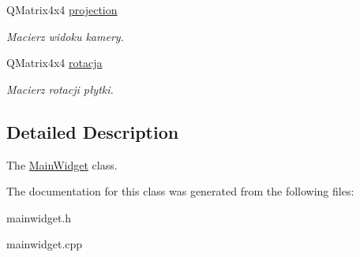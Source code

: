 \begin{DoxyCompactItemize}
\mbox{\label{classMainWidget_ab024c87ad22e1a41ec1d33dbf011fa0a}} 
Q\+Matrix4x4 \hyperlink{classMainWidget_ab024c87ad22e1a41ec1d33dbf011fa0a}{projection}
\begin{DoxyCompactList}\small\item\em Macierz widoku kamery. \end{DoxyCompactList}\item 
\mbox{\label{classMainWidget_aa834d062e80c28cd23f66d3f01a688f4}} 
Q\+Matrix4x4 \hyperlink{classMainWidget_aa834d062e80c28cd23f66d3f01a688f4}{rotacja}
\begin{DoxyCompactList}\small\item\em Macierz rotacji płytki. \end{DoxyCompactList}\end{DoxyCompactItemize}


\subsection{Detailed Description}
The \hyperlink{classMainWidget}{Main\+Widget} class. 

The documentation for this class was generated from the following files\+:\begin{DoxyCompactItemize}
\item 
mainwidget.\+h\item 
mainwidget.\+cpp\end{DoxyCompactItemize}
